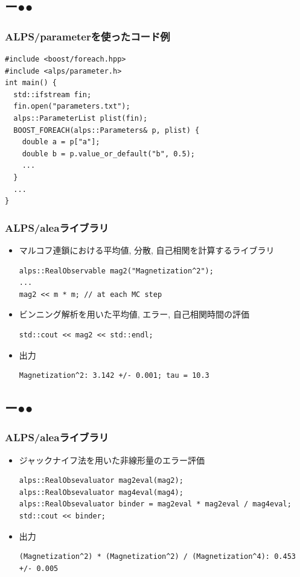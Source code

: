 \subsection*{{\protect\color{red}ー}{\protect\color{blue}●}{\protect\color{green}●}}

\begin{frame}[t,fragile]
  \frametitle{ALPS/parameterを使ったコード例}
  \begin{lstlisting}
#include <boost/foreach.hpp>
#include <alps/parameter.h>
int main() {
  std::ifstream fin;
  fin.open("parameters.txt");
  alps::ParameterList plist(fin);
  BOOST_FOREACH(alps::Parameters& p, plist) {
    double a = p["a"];
    double b = p.value_or_default("b", 0.5);
    ...
  }
  ...
}
\end{lstlisting}
\end{frame}

\begin{frame}[t,fragile]
  \frametitle{ALPS/aleaライブラリ}
  \begin{itemize}
  \item マルコフ連鎖における平均値, 分散, 自己相関を計算するライブラリ
    \begin{lstlisting}
alps::RealObservable mag2("Magnetization^2");
...
mag2 << m * m; // at each MC step
\end{lstlisting}
  \item ビンニング解析を用いた平均値, エラー, 自己相関時間の評価
    \begin{lstlisting}
std::cout << mag2 << std::endl;
\end{lstlisting}
  \item 出力
\begin{lstlisting}
Magnetization^2: 3.142 +/- 0.001; tau = 10.3
\end{lstlisting}
  \end{itemize}
\end{frame}

\subsection*{{\protect\color{red}ー}{\protect\color{blue}●}{\protect\color{green}●}}

\begin{frame}[t,fragile]
  \frametitle{ALPS/aleaライブラリ}
  \begin{itemize}
  \item ジャックナイフ法を用いた非線形量のエラー評価
    \begin{lstlisting}
alps::RealObsevaluator mag2eval(mag2);
alps::RealObsevaluator mag4eval(mag4);
alps::RealObsevaluator binder = mag2eval * mag2eval / mag4eval;
std::cout << binder;
\end{lstlisting}
  \item 出力
\begin{lstlisting}
(Magnetization^2) * (Magnetization^2) / (Magnetization^4): 0.453 +/- 0.005
\end{lstlisting}
  \end{itemize}
\end{frame}

